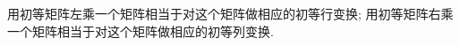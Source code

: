 \begin{Note} 用初等矩阵左乘一个矩阵相当于对这个矩阵做相应的初等行变换; 用初等矩阵右乘一个矩阵相当于对这个矩阵做相应的初等列变换.

\begin{comment}

\[
\begin{aligned}
P(j, i(k))\;A &=
\begin{pmatrix}
\gamma_1 \\
\vdots \\
\gamma_i \\
\vdots \\
\gamma_j \\
\vdots \\
\gamma_s \\
\end{pmatrix} =
\begin{pmatrix}
1 &        &   &        &   &        &   \\
  & \ddots &   &        &   &        &   \\
  &        & 1 &        &   &        &   \\
  &        &   & \ddots &   &        &   \\
  &        & k &        & 1 &        &   \\
  &        &   &        &   & \ddots &   \\
  &        &   &        &   &        & 1 \\
\end{pmatrix}
\begin{pmatrix}
\gamma_1 \\
\vdots \\
\gamma_i \\
\vdots \\
\gamma_j \\
\vdots \\
\gamma_s \\
\end{pmatrix} 
= 
\begin{pmatrix}
\gamma_1 \\
\vdots \\
\gamma_i \\
\vdots \\
k \gamma_i +\gamma_j \\
\vdots \\
\gamma_s \\
\end{pmatrix} \\
A\;P(j, i(k)) &= (\alpha_1, \cdots, \alpha_i, \cdots, \alpha_j, \cdots, \alpha_n)

\end{comment}
\end{Note}
